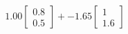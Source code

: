 \documentclass[preview]{standalone}
\begin{document}
\begin{align*}
1.00 \begin{bmatrix} 0.8 \\ 0.5 \end{bmatrix} + -1.65 \begin{bmatrix} 1 \\ 1.6 \end{bmatrix}
\end{align*}
\end{document}
